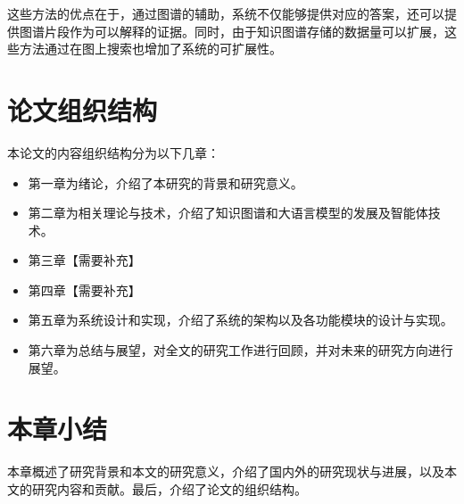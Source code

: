 这些方法的优点在于，通过图谱的辅助，系统不仅能够提供对应的答案，还可以提供图谱片段作为可以解释的证据。同时，由于知识图谱存储的数据量可以扩展，这些方法通过在图上搜索也增加了系统的可扩展性。


\section{论文组织结构}
本论文的内容组织结构分为以下几章：

\begin{itemize}
    \item 第一章为绪论，介绍了本研究的背景和研究意义。
    \item 第二章为相关理论与技术，介绍了知识图谱和大语言模型的发展及智能体技术。
    \item 第三章【需要补充】
    \item 第四章【需要补充】
    \item 第五章为系统设计和实现，介绍了系统的架构以及各功能模块的设计与实现。
    \item 第六章为总结与展望，对全文的研究工作进行回顾，并对未来的研究方向进行展望。
\end{itemize}

\section{本章小结}
本章概述了研究背景和本文的研究意义，介绍了国内外的研究现状与进展，以及本文的研究内容和贡献。最后，介绍了论文的组织结构。